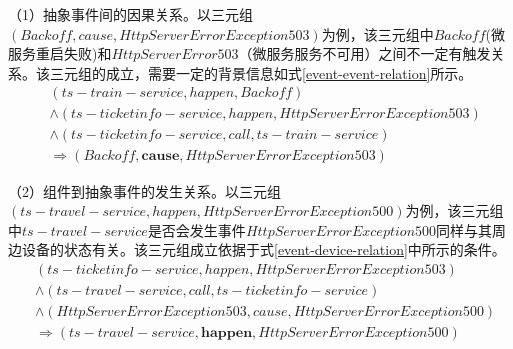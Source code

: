 （1）抽象事件间的因果关系。以三元组$\left(Backoff, cause, HttpServerError Exception 503\right)$为例，该三元组中$Backoff$(微服务重启失败)和$HttpServerError 503$（微服务服务不可用）之间不一定有触发关系。该三元组的成立，需要一定的背景信息如式\ref{event-event-relation}所示。
\begin{equation}
    \begin{aligned}
        &\left ( ts-train-service, happen, Backoff \right ) \\
        &\wedge \left ( ts-ticketinfo-service, happen, HttpServerError Exception 503 \right ) \\
        &\wedge \left ( ts-ticketinfo-service, call, ts-train-service \right ) \\
        &\Rightarrow \left ( Backoff, \boldsymbol{cause}, HttpServerError Exception 503 \right )
    \end{aligned}
\label{event-event-relation}
\end{equation}


（2）组件到抽象事件的发生关系。以三元组$(ts-travel-service, happen, HttpServerError Exception 500)$为例，该三元组中$ts-travel-service$是否会发生事件$HttpServerError$$Exception 500$同样与其周边设备的状态有关。该三元组成立依据于式\ref{event-device-relation}中所示的条件。
\begin{equation}
    \begin{aligned}
        &\left ( ts-ticketinfo-service, happen,  HttpServerError Exception 503\right ) \\
        &\wedge \left ( ts-travel-service, call, ts-ticketinfo-service \right ) \\
        &\wedge \left ( HttpServerError Exception 503, cause, HttpServerError Exception 500 \right ) \\
        &\Rightarrow \left ( ts-travel-service, \boldsymbol{happen}, HttpServerError Exception 500 \right )
    \end{aligned}
\label{event-device-relation}
\end{equation}

